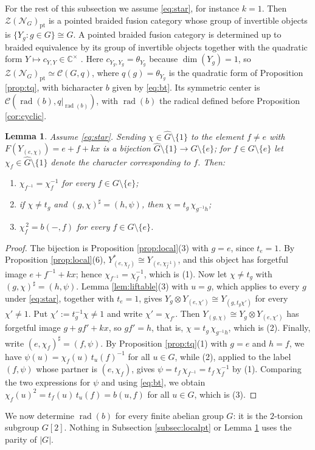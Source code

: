 \documentclass[10pt]{article}
\theoremstyle{plain}
\newtheorem{lemma}[theorem]{Lemma}
\theoremstyle{definition}
\theoremstyle{plain}
\begin{document}
For the rest of this subsection we assume \eqref{eq:star}, for instance $k=1$. Then $\mathcal{Z}(\mathcal{N}_G)_\mathrm{pt}$ is a pointed braided fusion category whose group of invertible objects is $\{Y_g:g\in G\}\cong G$. A pointed braided fusion category is determined up to braided equivalence by its group of invertible objects together with the quadratic form $Y\mapsto c_{Y,Y}\in\mathbb{C}^\times$ \cite[Proposition 2.41]{MR2609644}. Here $c_{Y_g,Y_g}=\theta_{Y_g}$ because $\dim(Y_g)=1$, so $\mathcal{Z}(\mathcal{N}_G)_\mathrm{pt}\simeq\mathcal{C}(G,q)$, where $q(g)=\theta_{Y_g}$ is the quadratic form of Proposition \ref{prop:tq}, with bicharacter $b$ given by \eqref{eq:bt}. Its symmetric center is $\mathcal{C}(\operatorname{rad}(b),q|_{\operatorname{rad}(b)})$, with $\operatorname{rad}(b)$ the radical defined before Proposition \ref{cor:cyclic}.

\begin{lemma}\label{lem:basic}
Assume \eqref{eq:star}. Sending $\chi\in\widehat{G}\setminus\{1\}$ to the element $f\neq e$ with $F(Y_{(e,\chi)})=e+f+kx$ is a bijection $\widehat{G}\setminus\{1\}\to G\setminus\{e\}$; for $f\in G\setminus\{e\}$ let $\chi_f\in\widehat{G}\setminus\{1\}$ denote the character corresponding to $f$. Then:
\begin{enumerate}
\item $\chi_{f^{-1}}=\chi_f^{-1}$ for every $f\in G\setminus\{e\}$;
\item if $\chi\neq t_g$ and $(g,\chi)^\sharp=(h,\psi)$, then $\chi=t_g\,\chi_{g^{-1}h}$;
\item $\chi_f^{\,2}=b(-,f)$ for every $f\in G\setminus\{e\}$.
\end{enumerate}
\end{lemma}

\begin{proof}
The bijection is Proposition \ref{prop:local}(3) with $g=e$, since $t_e=1$. By Proposition \ref{prop:local}(6), $Y_{(e,\chi_f)}^{*}\cong Y_{(e,\chi_f^{-1})}$, and this object has forgetful image $e+f^{-1}+kx$; hence $\chi_{f^{-1}}=\chi_f^{-1}$, which is (1). Now let $\chi\neq t_g$ with $(g,\chi)^\sharp=(h,\psi)$. Lemma \ref{lem:liftable}(3) with $u=g$, which applies to every $g$ under \eqref{eq:star}, together with $t_e=1$, gives $Y_g\otimes Y_{(e,\chi')}\cong Y_{(g,t_g\chi')}$ for every $\chi'\neq1$. Put $\chi':=t_g^{-1}\chi\neq1$ and write $\chi'=\chi_{f'}$. Then $Y_{(g,\chi)}\cong Y_g\otimes Y_{(e,\chi')}$ has forgetful image $g+gf'+kx$, so $gf'=h$, that is, $\chi=t_g\,\chi_{g^{-1}h}$, which is (2). Finally, write $(e,\chi_f)^\sharp=(f,\psi)$. By Proposition \ref{prop:tq}(1) with $g=e$ and $h=f$, we have $\psi(u)=\chi_f(u)\,t_u(f)^{-1}$ for all $u\in G$, while (2), applied to the label $(f,\psi)$ whose partner is $(e,\chi_f)$, gives $\psi=t_f\,\chi_{f^{-1}}=t_f\,\chi_f^{-1}$ by (1). Comparing the two expressions for $\psi$ and using \eqref{eq:bt}, we obtain $\chi_f(u)^2=t_f(u)\,t_u(f)=b(u,f)$ for all $u\in G$, which is (3).
\end{proof}
We now determine $\operatorname{rad}(b)$ for every finite abelian group $G$: it is the $2$-torsion subgroup $G[2]$. Nothing in Subsection \ref{subsec:localpt} or Lemma \ref{lem:basic} uses the parity of $|G|$.
\end{document}
